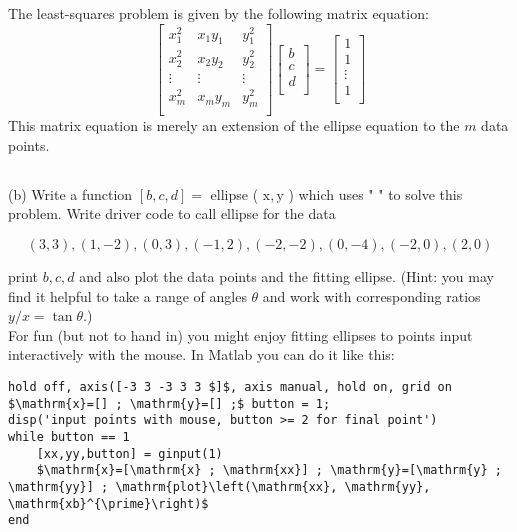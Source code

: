 \documentclass[10pt]{article}
\begin{document}
\subsubsection{}
The least-squares problem is given by the following matrix equation:
\begin{equation}
  \begin{bmatrix}
    x_{1}^{2} & x_{1} y_{1} & y_{1}^{2} \\
    x_{2}^{2} & x_{2} y_{2} & y_{2}^{2} \\
    \vdots & \vdots & \vdots \\
    x_{m}^{2} & x_{m} y_{m} & y_{m}^{2} \\
  \end{bmatrix}
  \begin{bmatrix}
    b \\
    c \\
    d \\
  \end{bmatrix}
  =
  \begin{bmatrix}
    1 \\
    1 \\
    \vdots \\
    1 \\
  \end{bmatrix}
\end{equation}
This matrix equation is merely an extension of the ellipse equation to the $m$ data points.
\subsection{}
(b) Write a function $[b, c, d]=$ ellipse ( $\mathrm{x}, \mathrm{y}$ ) which uses " " to solve this problem. Write driver code to call ellipse for the data

$$
(3,3),(1,-2),(0,3),(-1,2),(-2,-2),(0,-4),(-2,0),(2,0)
$$

print $b, c, d$ and also plot the data points and the fitting ellipse. (Hint: you may find it helpful to take a range of angles $\theta$ and work with corresponding ratios $y / x=\tan \theta$.)\\
For fun (but not to hand in) you might enjoy fitting ellipses to points input interactively with the mouse. In Matlab you can do it like this:

\begin{verbatim}
hold off, axis([-3 3 -3 3 3 $]$, axis manual, hold on, grid on
$\mathrm{x}=[] ; \mathrm{y}=[] ;$ button = 1;
disp('input points with mouse, button >= 2 for final point')
while button == 1
    [xx,yy,button] = ginput(1)
    $\mathrm{x}=[\mathrm{x} ; \mathrm{xx}] ; \mathrm{y}=[\mathrm{y} ; \mathrm{yy}] ; \mathrm{plot}\left(\mathrm{xx}, \mathrm{yy}, \mathrm{xb}^{\prime}\right)$
end
\end{verbatim}
\end{document}
